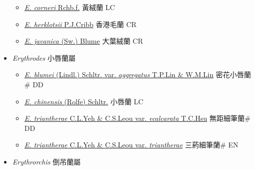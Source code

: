 \begin{itemize}
  \begin{itemize}
        \item[] \href{http://www.theplantlist.org/tpl1.1/search?q=Eria+corneri}{\textit{E. corneri} Rchb.f.}   黃絨蘭 LC
        \item[] \href{http://www.theplantlist.org/tpl1.1/search?q=Eria+herklotsii}{\textit{E. herklotsii} P.J.Cribb}   香港毛蘭 CR
        \item[] \href{http://www.theplantlist.org/tpl1.1/search?q=Eria+javanica}{\textit{E. javanica} (Sw.) Blume}   大葉絨蘭 CR
  \end{itemize}
 \item[] \textit{Erythrodes} 小唇蘭屬
                    
  \begin{itemize}
        \item[] \href{http://www.theplantlist.org/tpl1.1/search?q=Erythrodes+blumei+var.+aggregatus}{\textit{E. blumei} (Lindl.) Schltr. var. \textit{aggregatus} T.P.Lin \& W.M.Lin}   密花小唇蘭\# DD
        \item[] \href{http://www.theplantlist.org/tpl1.1/search?q=Erythrodes+chinensis}{\textit{E. chinensis} (Rolfe) Schltr.}     小唇蘭 LC
        \item[] \href{http://www.theplantlist.org/tpl1.1/search?q=Erythrodes+triantherae+var.+ecalcarata}{\textit{E. triantherae} C.L.Yeh \& C.S.Leou var. \textit{ecalcarata} T.C.Hsu}   無距細筆蘭\# DD
        \item[] \href{http://www.theplantlist.org/tpl1.1/search?q=Erythrodes+triantherae+var.+triantherae}{\textit{E. triantherae} C.L.Yeh \& C.S.Leou var. \textit{triantherae}}   三葯細筆蘭\# EN
  \end{itemize}
 \item[] \textit{Erythrorchis} 倒吊蘭屬
                    

\end{itemize}
